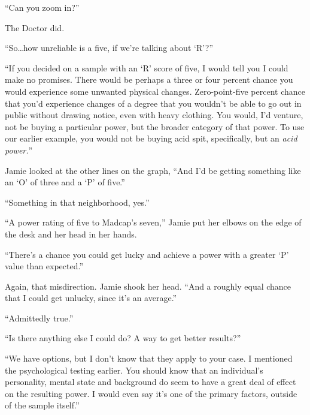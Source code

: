 ``Can you zoom in?''



The Doctor did.



``So\ldots how unreliable is a five, if we're talking about `R'?''



``If you decided on a sample with an `R' score of five, I would tell you I could make no promises.  There would be perhaps a three or four percent chance you would experience some unwanted physical changes.  Zero-point-five percent chance that you'd experience changes of a degree that you wouldn't be able to go out in public without drawing notice, even with heavy clothing.  You would, I'd venture, not be buying a particular power, but the broader category of that power.  To use our earlier example, you would not be buying acid spit, specifically, but an \emph{acid power.}''



Jamie looked at the other lines on the graph, ``And I'd be getting something like an `O' of three and a `P' of five.''



``Something in that neighborhood, yes.''



``A power rating of five to Madcap's seven,''  Jamie put her elbows on the edge of the desk and her head in her hands.



``There's a chance you could get lucky and achieve a power with a greater `P' value than expected.''



Again, that misdirection.  Jamie shook her head.  ``And a roughly equal chance that I could get unlucky, since it's an average.''



``Admittedly true.''



``Is there anything else I could do?  A way to get better results?''



``We have options, but I don't know that they apply to your case.  I mentioned the psychological testing earlier.  You should know that an individual's personality, mental state and background do seem to have a great deal of effect on the resulting power. I would even say it's one of the primary factors, outside of the sample itself.''



